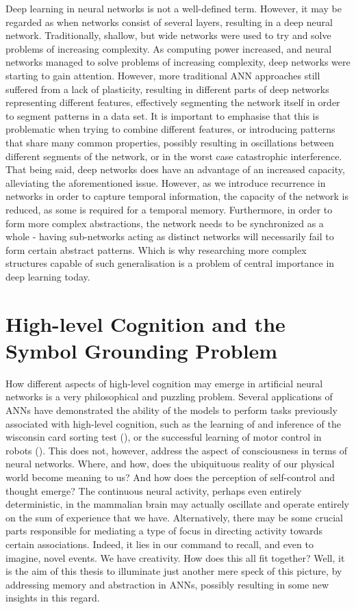 Deep learning in neural networks is not a well-defined term. However, it may be regarded as when networks consist of several layers, resulting in a deep neural network.
Traditionally, shallow, but wide networks were used to try and solve problems of increasing complexity.
As computing power increased, and neural networks managed to solve problems of increasing complexity, deep networks were starting to gain attention. However, more traditional ANN approaches still suffered from a lack of plasticity, resulting in different parts of deep networks representing different features, effectively segmenting the network itself in order to segment patterns in a data set. It is important to emphasise that this is problematic when trying to combine different features, or introducing patterns that share many common properties, possibly resulting in oscillations between different segments of the network, or in the worst case catastrophic interference.
That being said, deep networks does have an advantage of an increased capacity, alleviating the aforementioned issue. However, as we introduce recurrence in networks in order to capture temporal information, the capacity of the network is reduced, as some is required for a temporal memory. Furthermore, in order to form more complex abstractions, the network needs to be synchronized as a whole - having sub-networks acting as distinct networks will necessarily fail to form certain abstract patterns. Which is why researching more complex structures capable of such generalisation is a problem of central importance in deep learning today.


\section{High-level Cognition and the Symbol Grounding Problem}

How different aspects of high-level cognition may emerge in artificial neural networks is a very philosophical and puzzling problem. Several applications of ANNs have demonstrated the ability of the models to perform tasks previously associated with high-level cognition, such as the learning of and inference of the wisconsin card sorting test (\cite{Maniadakis2012}), or the successful learning of motor control in robots (\cite{Sugita2005, Yamashita2008, Tani2014}). This does not, however, address the aspect of consciousness in terms of neural networks. Where, and how, does the ubiquituous reality of our physical world become meaning to us? And how does the perception of self-control and thought emerge? The continuous neural activity, perhaps even entirely deterministic, in the mammalian brain may actually oscillate and operate entirely on the sum of experience that we have. Alternatively, there may be some crucial parts responsible for mediating a type of focus in directing activity towards certain associations. Indeed, it lies in our command to recall, and even to imagine, novel events. We have creativity. How does this all fit together? Well, it is the aim of this thesis to illuminate just another mere speck of this picture, by addressing memory and abstraction in ANNs, possibly resulting in some new insights in this regard.

